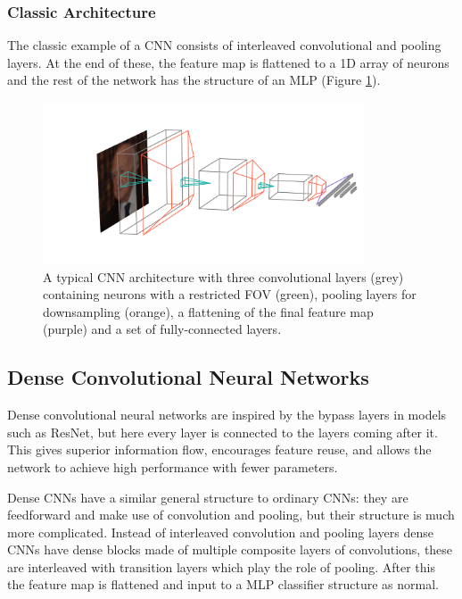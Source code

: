 \subsubsection{Classic Architecture}
The classic example of a CNN \cite{CS231n} consists of interleaved convolutional and pooling layers. At the end of these, the feature map is flattened to a 1D array of neurons and the rest of the network has the structure of an MLP (Figure \ref{fig:machine_learning:classic_CNN}). 
\begin{figure}[h!]
    \includegraphics[width=0.85\textwidth]{figures/machine_learning/convnet_arch.pdf}
    \caption{A typical CNN architecture with three convolutional layers (grey) containing neurons with a restricted FOV (green), pooling layers for downsampling (orange), a flattening of the final feature map (purple) and a set of fully-connected layers.}
        \label{fig:machine_learning:classic_CNN}
\end{figure}


\subsection{Dense Convolutional Neural Networks}
Dense convolutional neural networks \cite{DenseNet} are inspired by the bypass layers in models such as  ResNet, but here every layer is connected to the layers coming after it. 
This gives superior information flow, encourages feature reuse, and allows the network to achieve high performance with fewer parameters. 

Dense CNNs have a similar general structure to ordinary CNNs: they are feedforward and make use of convolution and pooling, but their structure is much more complicated. 
Instead of interleaved convolution and pooling layers dense CNNs have dense blocks made of multiple composite layers of convolutions, these are interleaved with transition layers which play the role of pooling. After this the feature map is flattened and input to a MLP classifier structure as normal. 

